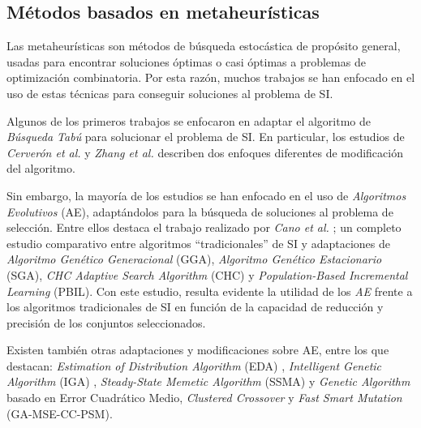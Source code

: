 \subsection{Métodos basados en metaheurísticas}

Las metaheurísticas son métodos de búsqueda estocástica de propósito general, usadas para encontrar soluciones óptimas o casi óptimas a problemas de optimización combinatoria. Por esta razón, muchos trabajos se han enfocado en el uso de estas técnicas para conseguir soluciones al problema de SI.

Algunos de los primeros trabajos se enfocaron en adaptar el algoritmo de \emph{Búsqueda Tabú} para solucionar el problema de SI. En particular, los estudios de \emph{Cerverón et al.} \cite{cerveron2001another} y \emph{Zhang et al.} \cite{zhang2002optimal} describen dos enfoques diferentes de modificación del algoritmo.

Sin embargo, la mayoría de los estudios se han enfocado en el uso de \emph{Algoritmos Evolutivos} (AE), adaptándolos para la búsqueda de soluciones al problema de selección. Entre ellos destaca el trabajo realizado por \emph{Cano et al.} \cite{cano2003using}; un completo estudio comparativo entre algoritmos ``tradicionales'' de SI y adaptaciones de \emph{Algoritmo Genético Generacional} (GGA), \emph{Algoritmo Genético Estacionario} (SGA), \emph{CHC Adaptive Search Algorithm} (CHC) y \emph{Population-Based Incremental Learning} (PBIL). Con este estudio, resulta evidente la utilidad de los \emph{AE} frente a los algoritmos tradicionales de SI en función de la capacidad de reducción y precisión de los conjuntos seleccionados.

Existen también otras adaptaciones y modificaciones sobre AE, entre los que destacan: \emph{Estimation of Distribution Algorithm} (EDA) \cite{sierra2001prototype}, \emph{Intelligent Genetic Algorithm} (IGA) \cite{ho2002design}, \emph{Steady-State Memetic Algorithm} (SSMA) \cite{garcia2008memetic} y \emph{Genetic Algorithm} \cite{gil2008evolving} basado en Error Cuadrático Medio, \emph{Clustered Crossover} y \emph{Fast Smart Mutation} (GA-MSE-CC-PSM).

